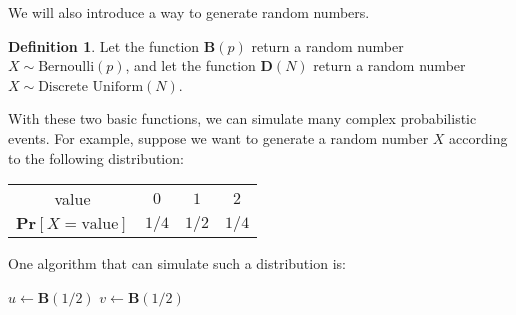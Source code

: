 \documentclass[12pt]{article}
\theoremstyle{plain}
\theoremstyle{definition}
\newtheorem{defn}{Definition}[section]
\theoremstyle{remark}
\renewcommand{\Pr}{\textbf{Pr}}
\begin{document}
We will also introduce a way to generate random numbers.

\begin{defn}
Let the function $\textbf{B}(p)$ return a random number $X\sim\text{Bernoulli}(p)$, and let the function $\textbf{D}(N)$ return a random number $X\sim\text{Discrete Uniform}(N)$.
\end{defn}

With these two basic functions, we can simulate many complex probabilistic events. For example, suppose we want to generate a random number $X$ according to the following distribution:

\begin{center}
\begin{tabular}{cccc}
\hline
value & $0$ & $1$ & $2$ \\
$\Pr[X=\text{value}]$ & $1/4$ & $1/2$ & $1/4$ \\
\hline
\end{tabular}
\end{center}

One algorithm that can simulate such a distribution is:

\begin{algorithm}
\DontPrintSemicolon
{}
$u\gets\textbf{B}(1/2)$\;
$v\gets\textbf{B}(1/2)$\;
\;
\end{algorithm}

\vspace{-5pt}
\end{document}
